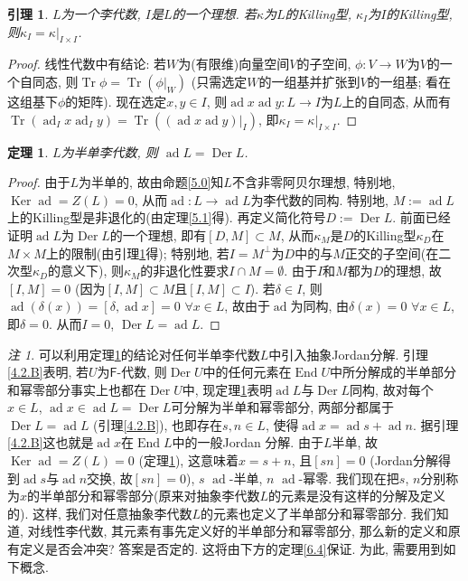 \documentclass{ctexart}%
\newtheorem{theorem}{定理}
\newtheorem{lemma}{引理}
\theoremstyle{definition}
\theoremstyle{remark}
\newtheorem{remark}{注}
\DeclareMathOperator{\ad}{ad}
\DeclareMathOperator{\Tr}{Tr}
\DeclareMathOperator{\End}{End}
\DeclareMathOperator{\Der}{Der}
\DeclareMathOperator{\Ker}{Ker}
\begin{document}
\begin{lemma}\label{5.1lemma}$L$为一个李代数, $I$是$L$的一个理想. 若$\kappa$为$L$的Killing型, $\kappa_I$为$I$的Killing型, 则$\kappa_I = \kappa|_{I\times I}$.
\end{lemma}
\begin{proof}
线性代数中有结论: 若$W$为(有限维)向量空间$V$的子空间, $\phi\colon V\rightarrow W$为$V$的一个自同态, 则$\Tr\phi=\Tr(\phi|_W)$ (只需选定$W$的一组基并扩张到$V$的一组基; 看在这组基下$\phi$的矩阵). 现在选定$x,y\in I$, 则$\ad x \ad y\colon L\rightarrow I$为$L$上的自同态, 从而有$\Tr(\ad_I x\ad_I y) = \Tr((\ad x \ad y)|_I)$, 即$\kappa_I= \kappa|_{I\times I}$. 
\end{proof}
\begin{theorem}\label{5.3}
$L$为半单李代数, 则 $\ad L=\Der L$.
\end{theorem}
\begin{proof}
由于$L$为半单的, 故由命题\ref{5.0}知$L$不含非零阿贝尔理想, 特别地, $\Ker \ad = Z(L)=0$, 从而$\ad\colon L\rightarrow \ad L$为李代数的同构. 特别地, $M:= \ad L$上的Killing型是非退化的(由定理\ref{5.1}得). 再定义简化符号$D:= \Der L$. 前面已经证明$\ad L$为$\Der L$的一个理想, 即有$[D,M]\subset M$, 从而$\kappa_M$是$D$的Killing型$\kappa_D$在$M\times M$上的限制(由引理\ref{5.1lemma}得); 特别地, 若$I=M^\perp$为$D$中的与$M$正交的子空间(在二次型$\kappa_D$的意义下), 则$\kappa_M$的非退化性要求$I\cap M=\emptyset$. 由于$I$和$M$都为$D$的理想, 故$[I,M]=0$ (因为$[I,M]\subset M$且$[I,M]\subset I$). 若$\delta \in I$, 则$\ad (\delta(x))=[\delta, \ad x]=0$ $\forall x\in L$, 故由于$\ad$为同构, 由$\delta(x)=0$ $\forall x \in L$, 即$\delta=0$. 从而$I=0$, $\Der L= \ad L$. 
\end{proof}
\begin{remark}\label{zhu6}
可以利用定理\ref{5.3}的结论对任何半单李代数$L$中引入抽象Jordan分解. 引理\ref{4.2.B}表明, 若$U$为$\mathsf{F}$-代数, 则$\Der U$中的任何元素在$\End U$中所分解成的半单部分和幂零部分事实上也都在$\Der U$中, 现定理\ref{5.3}表明$\ad L$与$\Der L$同构, 故对每个$x\in L$, $\ad x \in \ad L =\Der L$可分解为半单和幂零部分, 两部分都属于$\Der L=\ad L$ (引理\ref{4.2.B}), 也即存在$s,n\in L$, 使得$\ad x=\ad s+\ad n$. 据引理\ref{4.2.B}这也就是$\ad x$在$\End L$中的一般Jordan 分解. 由于$L$半单, 故$\Ker \ad = Z(L)=0$ (定理\ref{5.3}), 这意味着$x=s+n$, 且$[sn]=0$ (Jordan分解得到$\ad s$与$\ad n$交换, 故$[sn]=0$), $s$ $\ad$-半单, $n$ $\ad$-幂零. 我们现在把$s$, $n$分别称为$x$的半单部分和幂零部分(原来对抽象李代数$L$的元素是没有这样的分解及定义的). 这样, 我们对任意抽象李代数$L$的元素也定义了半单部分和幂零部分. 我们知道, 对线性李代数, 其元素有事先定义好的半单部分和幂零部分, 那么新的定义和原有定义是否会冲突? 答案是否定的. 这将由下方的定理\ref{6.4}保证. 为此, 需要用到如下概念.
\end{remark}
\end{document}

